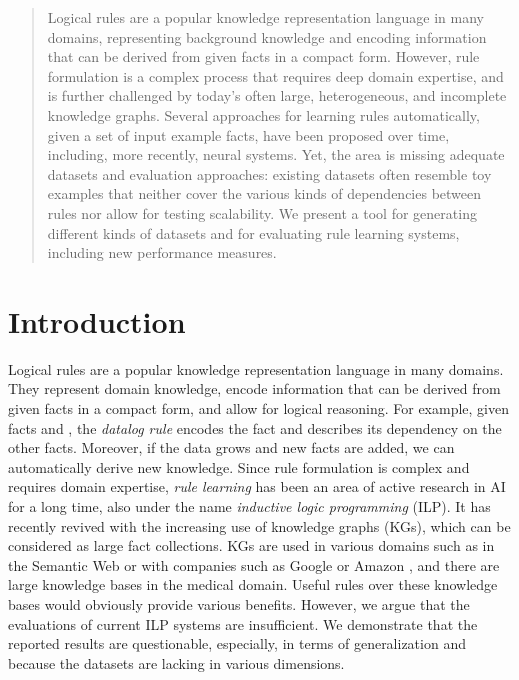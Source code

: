 \documentclass[letterpaper]{article} \usepackage{aaai20}  \usepackage{times}  \usepackage{helvet} \usepackage{courier}  \usepackage[hyphens]{url}  \usepackage{graphicx} \urlstyle{rm} \def\UrlFont{\rm}  \usepackage{graphicx}  \frenchspacing  \setlength{\pdfpagewidth}{8.5in}  \setlength{\pdfpageheight}{11in}  \usepackage{amsthm}
\author{
Cristina Cornelio \\
IBM Research\\
cor@zurich.ibm.com
\And
Veronika Thost\\
IBM Research\\
veronika.thost@ibm.com
}
\theoremstyle{definition}
\begin{document}
\maketitle

\begin{abstract}
Logical rules are a popular knowledge representation language in many domains, representing background knowledge and encoding information that can be derived from given facts in a compact form.
However, rule 
formulation is a complex process that requires deep domain expertise,
and is further challenged by today's often 
large, heterogeneous, and incomplete 
knowledge graphs. 
Several approaches for learning rules automatically, given 
a set of input example facts,
have been proposed over time,
including, more recently, neural systems.
Yet, the area is missing adequate datasets and evaluation approaches: existing datasets 
often resemble toy examples that neither cover the various kinds of dependencies between rules nor allow for testing scalability.
We present a tool for generating different kinds of 
datasets and for evaluating rule learning systems, including new performance measures.
\end{abstract}



\section{Introduction}

Logical rules are a popular knowledge representation language in many domains. They represent domain knowledge, encode information that can be derived from given facts in a compact form, and allow for logical reasoning.
For example, given facts  and , the \emph{datalog rule} \cite{datalog} 
 encodes the fact  and describes its dependency on the other facts. Moreover, if the data grows and new facts are added, we can automatically derive new knowledge.
Since rule formulation is complex and requires domain expertise,
\emph{rule learning} \cite{Raedt-08-Logical-and-relational-learning,Fuernkranz+-12-Foundations-of-Rule-Learning} has been an area of active research in AI for a long time, also under the name \emph{inductive logic programming} (ILP). 
It has recently revived with the 
increasing use of knowledge graphs (KGs), which can be considered as large fact collections. 
KGs are used in various domains such as in the Semantic Web or with companies such as Google \cite{google} or Amazon \cite{amazon}, and there are large knowledge bases in the medical domain. Useful rules over these knowledge bases would obviously provide various benefits.
However, we argue that the evaluations of current ILP systems are insufficient. We demonstrate that the reported results are questionable, especially, in terms of generalization and because the datasets are lacking in various dimensions.
\end{document}
